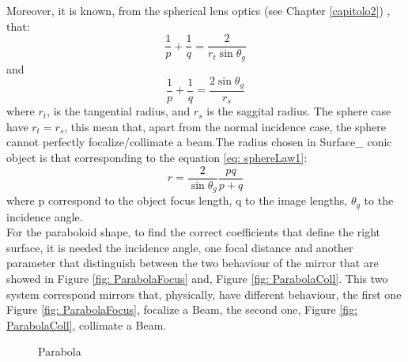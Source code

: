 Moreover, it is known, from the spherical lens optics (see Chapter \ref{capitolo2}) , that:
\begin{equation}
\frac{1}{p} + \frac{1}{q} = \frac{2}{r_t \sin \theta_g}
\label{eq: sphereLaw1}
\end{equation}
and
\begin{equation}
\frac{1}{p} + \frac{1}{q} = \frac{2 \sin \theta_g}{r_s}
\label{eq: sphereLaw2}
\end{equation}
where $r_t $, is the tangential radius, and $r_s $ is the saggital radius. The sphere case have $r_t = r_s $, this mean that, apart from the normal incidence case, the sphere cannot perfectly focalize/collimate a beam.The radius chosen in Surface\_ conic object is that corresponding to the equation \ref{eq: sphereLaw1}: 
\begin{equation}
r = \frac{2}{\sin \theta_g} \frac{pq}{p + q}
\end{equation}
where p correspond to the object focus length, q to the image lengths, $\theta_g $ to the incidence angle.
\\
For the paraboloid shape, to find the correct coefficients that define the right surface, it is needed the incidence angle, one focal distance and another parameter that distinguish between the two behaviour of the mirror that are showed in Figure \ref{fig: ParabolaFocus} and, Figure \ref{fig: ParabolaColl}. This two system correspond mirrors that, physically, have different behaviour, the first one Figure \ref{fig: ParabolaFocus}, focalize a Beam, the second one, Figure \ref{fig: ParabolaColl}, collimate a Beam.
\begin{figure}[H]
%
\centering
%
\quad
%
%
\caption{Parabola}
\label{fig :p3}
\end{figure}
